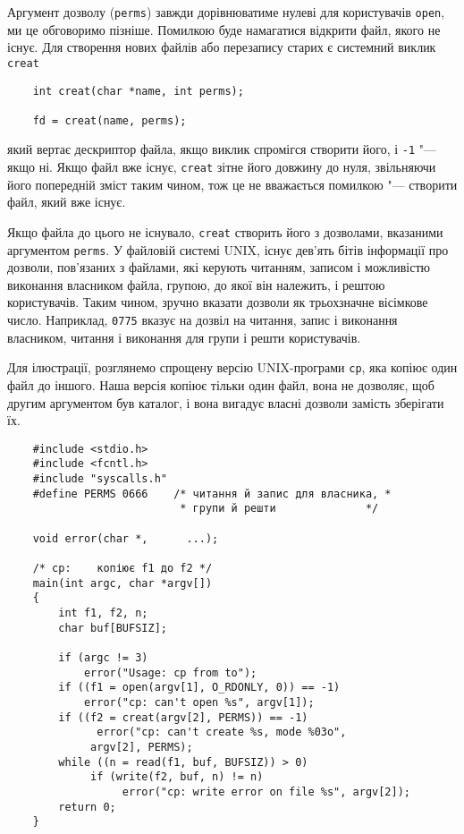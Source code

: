\documentclass[a4paper,12pt]{book}
\begin{document}
  Аргумент дозволу (\texttt{perms}) завжди дорівнюватиме нулеві для користувачів
  \texttt{open}, ми це обговоримо пізніше. Помилкою буде намагатися відкрити файл, якого
  не існує. Для створення нових файлів або перезапису старих є системний виклик
  \texttt{creat}
  \begin{verbatim}
    int creat(char *name, int perms);

    fd = creat(name, perms);
  \end{verbatim}
  який вертає дескриптор файла, якщо виклик спромігся створити його, і \texttt{-1} "---
  якщо ні. Якщо файл вже існує, \texttt{creat} зітне його довжину до нуля, звільняючи його
  попередній зміст таким чином, тож це не вважається помилкою "--- створити файл, який
  вже існує.

  Якщо файла до цього не існувало, \texttt{creat} створить його з дозволами, вказаними
  аргументом \texttt{perms}. У файловій системі UNIX, існує дев'ять бітів інформації про
  дозволи, пов'язаних з файлами, які керують читанням, записом і можливістю виконання
  власником файла, групою, до якої він належить, і рештою користувачів. Таким чином,
  зручно вказати дозволи як трьохзначне вісімкове число. Наприклад, \texttt{0775} вказує
  на дозвіл на читання, запис і виконання власником, читання і виконання для групи і решти
  користувачів.

  Для ілюстрації, розглянемо спрощену версію UNIX-програми \texttt{cp}, яка копіює один
  файл до іншого. Наша версія копіює тільки один файл, вона не дозволяє, щоб другим
  аргументом був каталог, і вона вигадує власні дозволи замість зберігати їх.

  \begin{verbatim}
    #include <stdio.h>
    #include <fcntl.h>
    #include "syscalls.h"
    #define PERMS 0666    /* читання й запис для власника, *
                           * групи й решти              */

    void error(char *,      ...);

    /* cp:    копіює f1 до f2 */
    main(int argc, char *argv[])
    {
        int f1, f2, n;
        char buf[BUFSIZ];

        if (argc != 3)
            error("Usage: cp from to");
        if ((f1 = open(argv[1], O_RDONLY, 0)) == -1)
            error("cp: can't open %s", argv[1]);
        if ((f2 = creat(argv[2], PERMS)) == -1)
              error("cp: can't create %s, mode %03o",
             argv[2], PERMS);
        while ((n = read(f1, buf, BUFSIZ)) > 0)
             if (write(f2, buf, n) != n)
                  error("cp: write error on file %s", argv[2]);
        return 0;
    }
  \end{verbatim}
\end{document}
